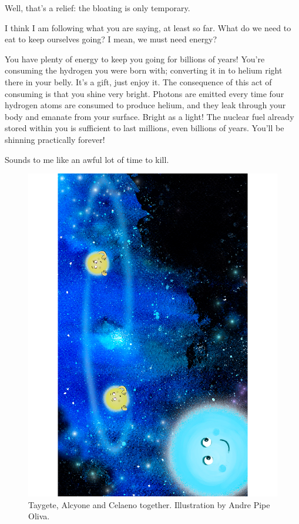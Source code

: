 \documentclass[main.tex]{subfiles}
\begin{document}
\par \Sterope Well, that's a relief: the bloating is only temporary.

\par \Alcyone I think I am following what you are saying, at least so far.  What do we need to eat to keep ourselves going?  I mean, we must need energy?

\par \Maia You have plenty of energy to keep you going for billions of years!  You're consuming the hydrogen you were born with; converting it in to helium right there in your belly.  It's a gift, just enjoy it.  The consequence of this act of consuming is that you shine very bright.  Photons are emitted every time four hydrogen atoms are consumed to produce helium, and they leak through your body and emanate from your surface.  Bright as a light!  The nuclear fuel already stored within you is sufficient to last millions, even billions of years.  You'll be shinning practically forever!

\par \Celaeno Sounds to me like an awful lot of time to kill.

\begin{figure}
\includegraphics[width=\columnwidth]{ch1_2.pdf}
\caption{Taygete, Alcyone and Celaeno together.  Illustration by Andre Pipe Oliva.
\label{fig:fig2}}
\end{figure}
\end{document}
